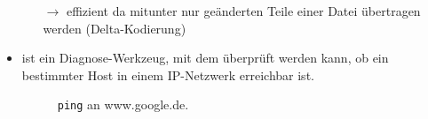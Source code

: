 \begin{itemize}
\begin{itemize}
		$\to$ effizient da mitunter nur geänderten Teile einer Datei übertragen werden (Delta-Kodierung)
	\end{itemize}
	\item {} ist ein Diagnose-Werkzeug, mit dem überprüft werden kann, ob ein bestimmter Host in einem IP-Netzwerk erreichbar ist.
	\begin{figure}[h]
		\centering
		\caption[\texttt{ping} an Google]{\texttt{ping} an www.google.de.}
		\label{fig:pinggoogle}
	\end{figure}
\end{itemize}

